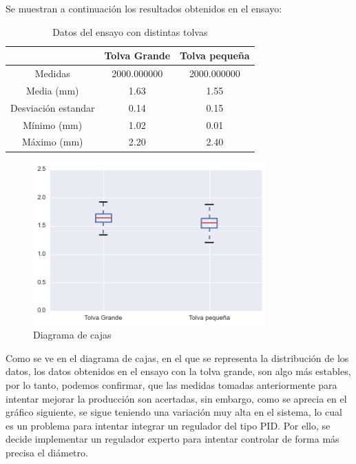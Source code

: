 Se muestran a continuación los resultados obtenidos en el ensayo:

\begin{table}[H]
    \centering
    \begin{tabular}{ccc}
                            & Tolva Grande & Tolva pequeña \\ \hline
        Medidas               & 2000.000000  & 2000.000000   \\
        Media (mm)          & 1.63     & 1.55      \\
        Desviación estandar & 0.14     & 0.15      \\
        Mínimo (mm)             & 1.02     & 0.01      \\
        Máximo (mm)             & 2.20     & 2.40     
    \end{tabular}
    \caption{Datos del ensayo con distintas tolvas}
    \label{tab:ensa_tolvas}
\end{table}

\begin{figure}[H]
    \centering
    \includegraphics[width=0.8\textwidth]{images/producciones/22072015/output_6_1.png}
    \caption{Diagrama de cajas }
    \label{fig:22072015-boxplot}
\end{figure}

Como se ve en el diagrama de cajas, en el que se representa la distribución de los datos, los datos obtenidos en el ensayo con la tolva grande, son algo más estables, por lo tanto, podemos confirmar, que las medidas tomadas anteriormente para intentar mejorar la producción son acertadas, sin embargo, como se aprecia en el gráfico siguiente, se sigue teniendo una variación muy alta en el sistema, lo cual es un problema para intentar integrar un regulador del tipo PID. Por ello, se decide implementar un regulador experto para intentar controlar de forma más precisa el diámetro.


